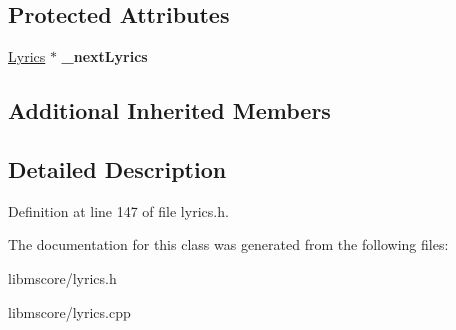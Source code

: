 \subsection*{Protected Attributes}
\begin{DoxyCompactItemize}
\item 
\mbox{\label{class_ms_1_1_lyrics_line_aac0a950b5363ebc5357968b356cf9e92}} 
\hyperlink{class_ms_1_1_lyrics}{Lyrics} $\ast$ {\bfseries \+\_\+next\+Lyrics}
\end{DoxyCompactItemize}
\subsection*{Additional Inherited Members}


\subsection{Detailed Description}


Definition at line 147 of file lyrics.\+h.



The documentation for this class was generated from the following files\+:\begin{DoxyCompactItemize}
\item 
libmscore/lyrics.\+h\item 
libmscore/lyrics.\+cpp\end{DoxyCompactItemize}
